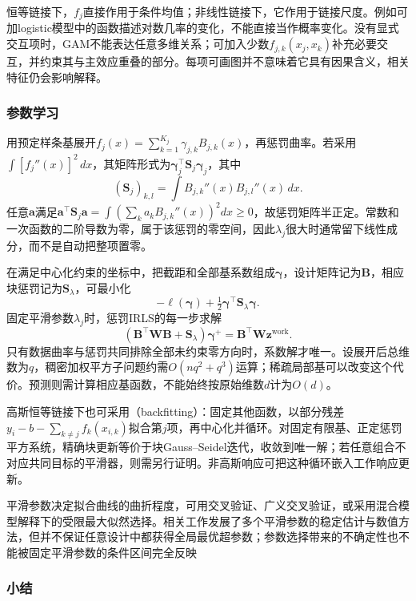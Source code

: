 恒等链接下，$f_j$直接作用于条件均值；非线性链接下，它作用于链接尺度。例如可加logistic模型中的函数描述对数几率的变化，不能直接当作概率变化。没有显式交互项时，GAM不能表达任意多维关系；可加入少数$f_{j,k}(x_j,x_k)$补充必要交互，并约束其与主效应重叠的部分。每项可画图并不意味着它具有因果含义，相关特征仍会影响解释。

\subsubsection{参数学习}

用预定样条基展开$f_j(x)=\sum_{k=1}^{K_j}\gamma_{j,k}B_{j,k}(x)$，再惩罚曲率。若采用$\int[f_j''(x)]^2\,dx$，其矩阵形式为$\bm{\gamma}_j^{\top}\bm{S}_j\bm{\gamma}_j$，其中
\[
  (\bm{S}_j)_{k,l}=\int B_{j,k}''(x)B_{j,l}''(x)\,dx.
\]
任意$\bm{a}$满足$\bm{a}^{\top}\bm{S}_j\bm{a}=\int(\sum_k a_kB_{j,k}''(x))^2dx\geq0$，故惩罚矩阵半正定。常数和一次函数的二阶导数为零，属于该惩罚的零空间，因此$\lambda_j$很大时通常留下线性成分，而不是自动把整项置零。

在满足中心化约束的坐标中，把截距和全部基系数组成$\bm{\gamma}$，设计矩阵记为$\bm{B}$，相应块惩罚记为$\bm{S}_{\lambda}$，可最小化
\[
  -\ell(\bm{\gamma})+\tfrac12\bm{\gamma}^{\top}
       \bm{S}_{\lambda}\bm{\gamma}.
\]
固定平滑参数$\lambda_j$时，惩罚IRLS的每一步求解
\begin{equation}
  (\bm{B}^{\top}\bm{W}\bm{B}+\bm{S}_{\lambda})
       \bm{\gamma}^{+}
  =\bm{B}^{\top}\bm{W}\bm{z}^{\mathrm{work}}.
  \label{eq:regression-gam-irls}
\end{equation}
只有数据曲率与惩罚共同排除全部未约束零方向时，系数解才唯一。设展开后总维数为$q$，稠密加权平方子问题约需$O(nq^2+q^3)$运算；稀疏局部基可以改变这个代价。预测则需计算相应基函数，不能始终按原始维数$d$计为$O(d)$。

高斯恒等链接下也可采用（backfitting）：固定其他函数，以部分残差$y_i-b-\sum_{k\ne j}f_k(x_{i,k})$拟合第$j$项，再中心化并循环。对固定有限基、正定惩罚平方系统，精确块更新等价于块Gauss--Seidel迭代，收敛到唯一解；若任意组合不对应共同目标的平滑器，则需另行证明。非高斯响应可把这种循环嵌入工作响应更新。

平滑参数决定拟合曲线的曲折程度，可用交叉验证、广义交叉验证，或采用混合模型解释下的受限最大似然选择。相关工作发展了多个平滑参数的稳定估计与数值方法，但并不保证任意设计中都获得全局最优超参数；参数选择带来的不确定性也不能被固定平滑参数的条件区间完全反映

\subsubsection{小结}

